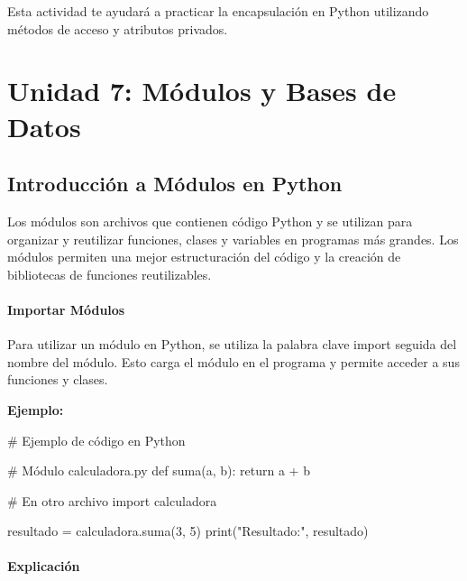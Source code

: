 \documentclass[
  a4paper,
  DIV=11,
  numbers=noendperiod,
  onepage,
  openany]{scrreprt}
\newenvironment{Shaded}{\begin{snugshade}}{\end{snugshade}}
\newcommand{\BuiltInTok}[1]{\textcolor[rgb]{0.00,0.23,0.31}{#1}}
\newcommand{\CommentTok}[1]{\textcolor[rgb]{0.37,0.37,0.37}{#1}}
\newcommand{\ControlFlowTok}[1]{\textcolor[rgb]{0.00,0.23,0.31}{#1}}
\newcommand{\DecValTok}[1]{\textcolor[rgb]{0.68,0.00,0.00}{#1}}
\newcommand{\ImportTok}[1]{\textcolor[rgb]{0.00,0.46,0.62}{#1}}
\newcommand{\KeywordTok}[1]{\textcolor[rgb]{0.00,0.23,0.31}{#1}}
\newcommand{\NormalTok}[1]{\textcolor[rgb]{0.00,0.23,0.31}{#1}}
\newcommand{\OperatorTok}[1]{\textcolor[rgb]{0.37,0.37,0.37}{#1}}
\newcommand{\StringTok}[1]{\textcolor[rgb]{0.13,0.47,0.30}{#1}}
\begin{document}
Esta actividad te ayudará a practicar la encapsulación en Python
utilizando métodos de acceso y atributos privados.

\part{Unidad 7: Módulos y Bases de Datos}

\chapter{Introducción a Módulos en
Python}\label{introducciuxf3n-a-muxf3dulos-en-python}

Los módulos son archivos que contienen código Python y se utilizan para
organizar y reutilizar funciones, clases y variables en programas más
grandes. Los módulos permiten una mejor estructuración del código y la
creación de bibliotecas de funciones reutilizables.

\subsection{Importar Módulos}\label{importar-muxf3dulos}

Para utilizar un módulo en Python, se utiliza la palabra clave import
seguida del nombre del módulo. Esto carga el módulo en el programa y
permite acceder a sus funciones y clases.

\textbf{Ejemplo:}

\begin{Shaded}
\begin{Highlighting}[]
\CommentTok{\# Ejemplo de código en Python}

\CommentTok{\# Módulo calculadora.py}
\KeywordTok{def}\NormalTok{ suma(a, b):}
    \ControlFlowTok{return}\NormalTok{ a }\OperatorTok{+}\NormalTok{ b}

\CommentTok{\# En otro archivo}
\ImportTok{import}\NormalTok{ calculadora}

\NormalTok{resultado }\OperatorTok{=}\NormalTok{ calculadora.suma(}\DecValTok{3}\NormalTok{, }\DecValTok{5}\NormalTok{)}
\BuiltInTok{print}\NormalTok{(}\StringTok{"Resultado:"}\NormalTok{, resultado)}
\end{Highlighting}
\end{Shaded}

\subsection{Explicación}\label{explicaciuxf3n-43}
\end{document}
